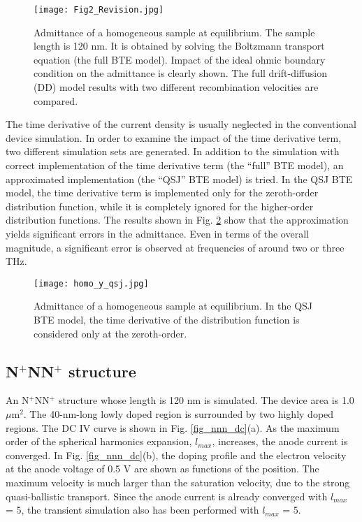 \documentclass[journal]{IEEEtran}
\newcommand{\revision}[1]{{#1}}
\begin{document}
\begin{figure}[!t]
\centering
\texttt{[image: Fig2\_Revision.jpg]}
\caption{Admittance of a homogeneous sample at equilibrium.
\revision{The sample length is 120 nm.}
It is obtained by solving the Boltzmann transport equation (the full BTE model).
\revision{Impact of the ideal ohmic boundary condition on the admittance is clearly shown.
The full drift-diffusion (DD) model results with two different recombination velocities are compared.}}
\label{fig_homo_y}
\end{figure}   
      
   The time derivative of the current density is usually neglected in the conventional device simulation.
   In order to examine the impact of the time derivative term, two different simulation sets are generated.
   In addition to the simulation with correct implementation of the time derivative term (the ``full'' BTE model), an approximated implementation (the ``QSJ'' BTE model) is tried.
   In the QSJ BTE model, the time derivative term is implemented only for the zeroth-order distribution function, while it is completely ignored for the higher-order distribution functions.
   The results shown in Fig. \ref{fig_homo_y_qsj} show that the approximation yields significant errors in the admittance.
   Even in terms of the overall magnitude, a significant error is observed at frequencies of around two or three THz.
         
\begin{figure}[!t]
\centering
\texttt{[image: homo\_y\_qsj.jpg]}
\caption{Admittance of a homogeneous sample at equilibrium.
In the QSJ BTE model, the time derivative of the distribution function is considered only at the zeroth-order.}
\label{fig_homo_y_qsj}
\end{figure}    

\subsection{N$^+$NN$^+$ structure}

   An N$^+$NN$^+$ structure whose length is 120 nm is simulated.     
   The device area is 1.0 $\mu$m$^2$.  
   The 40-nm-long lowly doped region is surrounded by two highly doped regions.
\revision{The DC IV curve is shown in Fig. \ref{fig_nnn_dc}(a).}
   As the maximum order of the spherical harmonics expansion, $l_{max}$, increases, the anode current is converged.
\revision{In Fig. \ref{fig_nnn_dc}(b), the doping profile and the electron velocity at the anode voltage of 0.5 V are shown as functions of the position.
   The maximum velocity is much larger than the saturation velocity, due to the strong quasi-ballistic transport.} 
   Since the anode current is already converged with $l_{max}$ = 5, 
the transient simulation also has been performed with $l_{max}$ = 5.    
   
\end{document}
